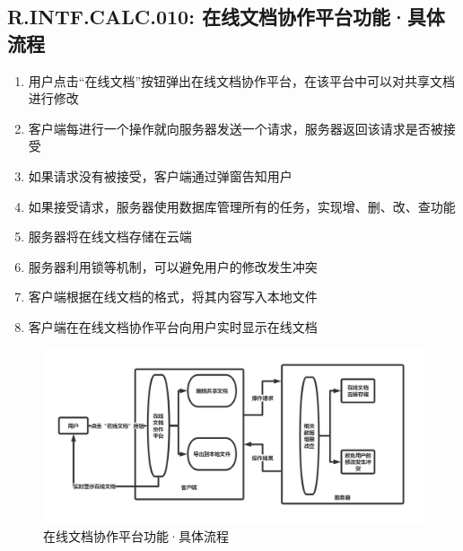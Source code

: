     \subsection{R.INTF.CALC.010: 在线文档协作平台功能·具体流程}
    \begin{enumerate}
        \item 用户点击“在线文档”按钮弹出在线文档协作平台，在该平台中可以对共享文档 进行修改
        \item 客户端每进行一个操作就向服务器发送一个请求，服务器返回该请求是否被接受
        \item 如果请求没有被接受，客户端通过弹窗告知用户
        \item 如果接受请求，服务器使用数据库管理所有的任务，实现增、删、改、查功能
        \item 服务器将在线文档存储在云端
        \item 服务器利用锁等机制，可以避免用户的修改发生冲突
        \item 客户端根据在线文档的格式，将其内容写入本地文件
        \item 客户端在在线文档协作平台向用户实时显示在线文档
    \end{enumerate}
        \begin{figure}[h]
            \centering
            \includegraphics[scale=0.4]{OutlineDesign/figures/在线文档协作平台功能·具体流程.png}
            \caption{在线文档协作平台功能·具体流程}
            \label{fig:server_flow}
        \end{figure}
